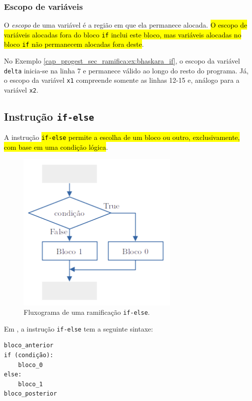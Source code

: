 \subsubsection{Escopo de variáveis}

O \emph{escopo} de uma variável é a região em que ela permanece alocada. \hl{O escopo de variáveis alocadas fora do bloco {\lstinline+if+} inclui este bloco, mas variáveis alocadas no bloco {\lstinline+if+} não permanecem alocadas fora deste}.

\begin{ex}
  No Exemplo \ref{cap_progest_sec_ramifica:ex:bhaskara_if}, o escopo da variável \lstinline+delta+ inicia-se na linha 7 e permanece válido ao longo do resto do programa. Já, o escopo da variável \lstinline+x1+ compreende somente as linhas 12-15 e, análogo para a variável \lstinline+x2+. 
\end{ex}

\subsection{Instrução \lstinline+if-else+}

A instrução \hl{{\lstinline+if-else+} permite a escolha de um bloco ou outro, exclusivamente, com base em uma condição lógica}.

\begin{figure}[H]
  \centering
  \includegraphics[width=0.7\textwidth]{./cap_progest/dados/fig_fg_else/fig}
  \caption{Fluxograma de uma ramificação \lstinline+if-else+.}
  \label{cap_progest_sec_ramifica:fig:fg_else}
\end{figure}

Em {\python}, a instrução \lstinline+if-else+ tem a seguinte sintaxe:
\begin{lstlisting}
bloco_anterior
if (condição):
    bloco_0
else:
    bloco_1
bloco_posterior
\end{lstlisting}

